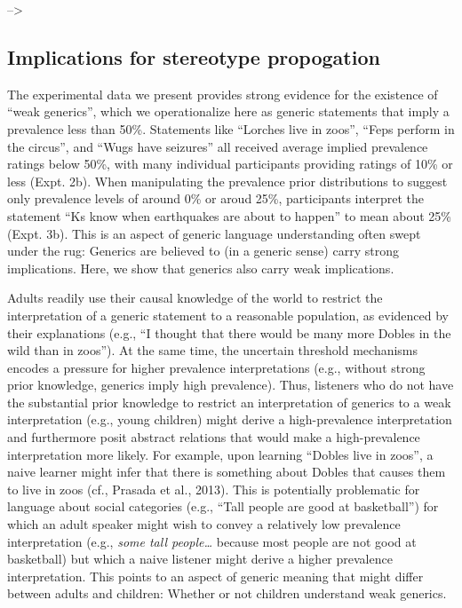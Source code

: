 \documentclass[,man,floatsintext]{apa6}
\theoremstyle{definition}
\theoremstyle{definition}
\theoremstyle{definition}
\theoremstyle{remark}
\begin{document}
--\textgreater{}

\hypertarget{implications-for-stereotype-propogation}{%
\subsection{Implications for stereotype
propogation}\label{implications-for-stereotype-propogation}}

The experimental data we present provides strong evidence for the
existence of \enquote{weak generics}, which we operationalize here as
generic statements that imply a prevalence less than 50\%. Statements
like \enquote{Lorches live in zoos}, \enquote{Feps perform in the
circus}, and \enquote{Wugs have seizures} all received average implied
prevalence ratings below 50\%, with many individual participants
providing ratings of 10\% or less (Expt. 2b). When manipulating the
prevalence prior distributions to suggest only prevalence levels of
around 0\% or aroud 25\%, participants interpret the statement
\enquote{Ks know when earthquakes are about to happen} to mean about
25\% (Expt. 3b). This is an aspect of generic language understanding
often swept under the rug: Generics are believed to (in a generic sense)
carry strong implications. Here, we show that generics also carry weak
implications.

Adults readily use their causal knowledge of the world to restrict the
interpretation of a generic statement to a reasonable population, as
evidenced by their explanations (e.g., \enquote{I thought that there
would be many more Dobles in the wild than in zoos}). At the same time,
the uncertain threshold mechanisms encodes a pressure for higher
prevalence interpretations (e.g., without strong prior knowledge,
generics imply high prevalence). Thus, listeners who do not have the
substantial prior knowledge to restrict an interpretation of generics to
a weak interpretation (e.g., young children) might derive a
high-prevalence interpretation and furthermore posit abstract relations
that would make a high-prevalence interpretation more likely. For
example, upon learning \enquote{Dobles live in zoos}, a naive learner
might infer that there is something about Dobles that causes them to
live in zoos (cf., Prasada et al., 2013). This is potentially
problematic for language about social categories (e.g., \enquote{Tall
people are good at basketball}) for which an adult speaker might wish to
convey a relatively low prevalence interpretation (e.g., \emph{some tall
people\ldots{}} because most people are not good at basketball) but
which a naive listener might derive a higher prevalence interpretation.
This points to an aspect of generic meaning that might differ between
adults and children: Whether or not children understand weak generics.
\end{document}
